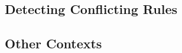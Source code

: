 \documentclass{l4proj}
\begin{document}
\subsection{Detecting Conflicting Rules}
\subsection{Other Contexts}







\end{document}
